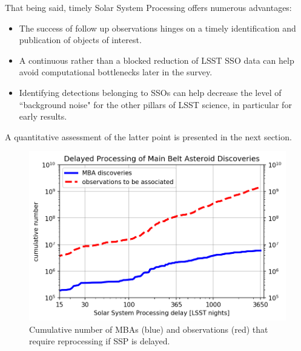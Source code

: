 That being said, timely Solar System Processing offers numerous advantages:
\begin{itemize}
\item The success of follow up observations hinges on a timely identification and publication of objects of interest.
\item A continuous rather than a blocked reduction of LSST SSO data can help avoid computational bottlenecks later in the survey.
\item Identifying detections belonging to SSOs can help decrease the level of ``background noise" for the other pillars of LSST science, in particular for early results. 
\end{itemize}
A quantitative assessment of the latter point is presented in the next section.
%
\begin{figure}[tb!]
\begin{center}
\includegraphics[width=0.70\linewidth]{figs/reprocessing4.png}
\caption{Cumulative number of MBAs (blue) and observations (red) that require reprocessing if SSP is delayed. }
\end{center}
\label{fig:rep}       %
\end{figure}

\clearpage

